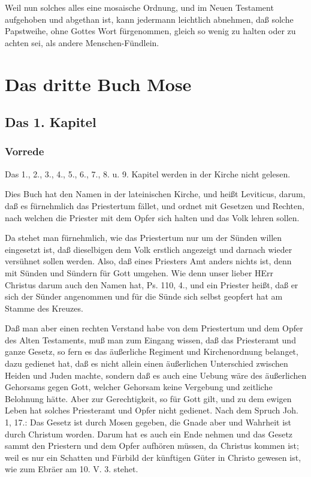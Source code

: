 Weil nun solches alles eine mosaische Ordnung, und im Neuen Testament aufgehoben und abgethan ist, kann jedermann leichtlich abnehmen, daß solche Papstweihe, ohne Gottes Wort fürgenommen, gleich so wenig zu halten oder zu achten sei, als andere Menschen-Fündlein.

\part{Das dritte Buch Mose}

\chapter{Das 1. Kapitel}

\section{Vorrede}

Das 1., 2., 3., 4., 5., 6., 7., 8. u. 9. Kapitel werden in der Kirche nicht gelesen.

Dies Buch hat den Namen in der lateinischen Kirche, und heißt Leviticus, darum, daß es fürnehmlich das Priestertum fället, und ordnet mit Gesetzen und Rechten, nach welchen die Priester mit dem Opfer sich halten und das Volk lehren sollen.

Da stehet man fürnehmlich, wie das Priestertum nur um der Sünden willen eingesetzt ist, daß dieselbigen dem Volk erstlich angezeigt und darnach wieder versühnet sollen werden. Also, daß eines Priesters Amt anders nichts ist, denn mit Sünden und Sündern für Gott umgehen. Wie denn unser lieber HErr Christus darum auch den Namen hat, Ps. 110, 4., und ein Priester heißt, daß er sich der Sünder angenommen und für die Sünde sich selbst geopfert hat am Stamme des Kreuzes.

Daß man aber einen rechten Verstand habe von dem Priestertum und dem Opfer des Alten Testaments, muß man zum Eingang wissen, daß das Priesteramt und ganze Gesetz, so fern es das äußerliche Regiment und Kirchenordnung belanget, dazu gedienet hat, daß es nicht allein einen äußerlichen Unterschied zwischen Heiden und Juden machte, sondern daß es auch eine Uebung wäre des äußerlichen Gehorsams gegen Gott, welcher Gehorsam keine Vergebung und zeitliche Belohnung hätte. Aber zur Gerechtigkeit, so für Gott gilt, und zu dem ewigen Leben hat solches Priesteramt und Opfer nicht gedienet. Nach dem Spruch Joh. 1, 17.: Das Gesetz ist durch Mosen gegeben, die Gnade aber und Wahrheit ist durch Christum worden. Darum hat es auch ein Ende nehmen und das Gesetz sammt den Priestern und dem Opfer aufhören müssen, da Christus kommen ist; weil es nur ein Schatten und Fürbild der künftigen Güter in Christo gewesen ist, wie zum Ebräer am 10. V. 3. stehet.

